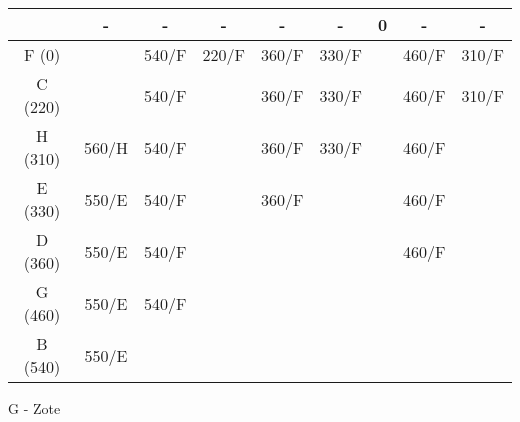 \documentclass[12pt]{article}
\begin{document}
\begin{enumerate}
\begin{tabular}{|c|c|c|c|c|c|c|c|c|}
             & {\color[HTML]{000000} -}     & {\color[HTML]{333333} -}     & {\color[HTML]{333333} -}     & -                            & -                            & {\color[HTML]{FE0000} 0} & -                            & -                            \\ \hline
F (0)        &                              & 540/F                        & {\color[HTML]{FE0000} 220/F} & 360/F                        & {\color[HTML]{333333} 330/F} & {\color[HTML]{FE0000} }  & {\color[HTML]{333333} 460/F} & 310/F                        \\ \hline
C (220)      &                              & 540/F                        &                              & 360/F                        & 330/F                        & {\color[HTML]{FE0000} }  & {\color[HTML]{333333} 460/F} & {\color[HTML]{FE0000} 310/F} \\ \hline
H (310)      & 560/H                        & 540/F                        &                              & {\color[HTML]{333333} 360/F} & {\color[HTML]{FE0000} 330/F} &                          & {\color[HTML]{333333} 460/F} & {\color[HTML]{FE0000} }      \\ \hline
E (330)      & 550/E                        & 540/F                        & {\color[HTML]{000000} }      & {\color[HTML]{FE0000} 360/F} &                              & {\color[HTML]{FE0000} }  & {\color[HTML]{333333} 460/F} & {\color[HTML]{FE0000} }      \\ \hline
D (360)      & 550/E                        & {\color[HTML]{333333} 540/F} & {\color[HTML]{FE0000} }      & {\color[HTML]{FE0000} }      & {\color[HTML]{FE0000} }      &                          & {\color[HTML]{FE0000} 460/F} &                              \\ \hline
G (460)      & {\color[HTML]{333333} 550/E} & {\color[HTML]{FE0000} 540/F} & {\color[HTML]{FE0000} }      & {\color[HTML]{FE0000} }      & {\color[HTML]{FE0000} }      &                          &                              &                              \\ \hline
B (540)      & {\color[HTML]{FE0000} 550/E} & {\color[HTML]{FE0000} }      &                              &                              &                              &                          &                              &                              \\ \hline
\end{tabular}
\newpage
G - Zote
\\
\\

\end{enumerate}
\end{document}
